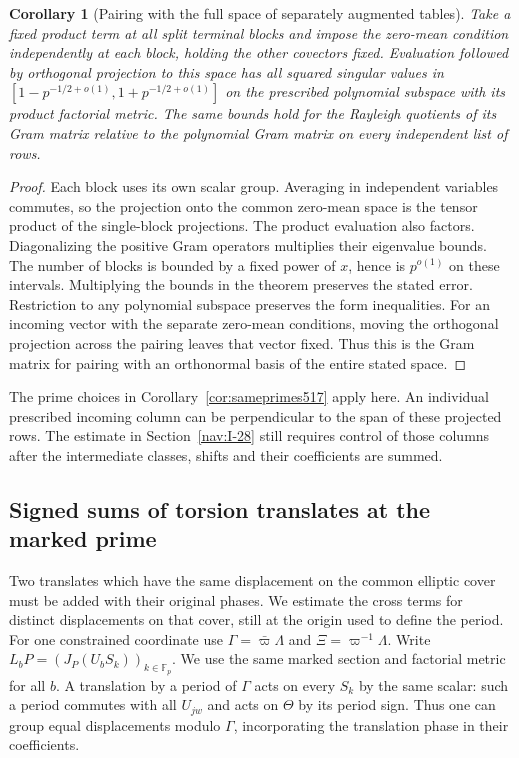 \documentclass[a4paper,11pt]{article}
\newtheorem{corollary}[proposition]{Corollary}
\theoremstyle{definition}
\theoremstyle{remark}
\numberwithin{equation}{section}
\begin{document}
\begin{corollary}[Pairing with the full space of separately augmented tables]
\leavevmode\label{cor:multipleaugmentations519}
Take a fixed product term at all split terminal blocks and impose
the zero-mean condition independently at each block, holding the
other covectors fixed. Evaluation followed by orthogonal projection
to this space has all squared singular values in
\([1-p^{-1/2+o(1)},1+p^{-1/2+o(1)}]\) on the prescribed polynomial
subspace with its product factorial metric. The same bounds hold
for the Rayleigh quotients of its Gram matrix relative to the
polynomial Gram matrix on every independent list of rows.
\end{corollary}
\begin{proof}
Each block uses its own scalar group. Averaging in independent
variables commutes, so the projection onto the common zero-mean
space is the tensor product of the single-block projections. The
product evaluation also factors. Diagonalizing the positive Gram
operators multiplies their eigenvalue bounds. The number of blocks
is bounded by a fixed power of \(x\), hence is \(p^{o(1)}\) on
these intervals. Multiplying the bounds in the theorem preserves
the stated error. Restriction to any polynomial subspace preserves
the form inequalities. For an incoming vector with the separate
zero-mean conditions, moving the orthogonal projection across the
pairing leaves that vector fixed. Thus this is the Gram matrix for
pairing with an orthonormal basis of the entire stated space.
\end{proof}

The prime choices in Corollary~\ref{cor:sameprimes517} apply here.
An individual prescribed incoming column can be perpendicular to
the span of these projected rows. The estimate in
Section~\ref{nav:I-28} still requires control of those columns after
the intermediate classes, shifts and their coefficients are summed.


\subsection{Signed sums of torsion translates at the marked prime}
\label{sec:signedtranslates520}

Two translates which have the same displacement on the common
elliptic cover must be added with their original phases. We estimate
the cross terms for distinct displacements on that cover, still at
the origin used to define the period. For one constrained coordinate
use \(\Gamma=\bar\varpi\Lambda\) and \(\Xi=\varpi^{-1}\Lambda\).
Write \(L_bP=(J_P(U_bS_k))_{k\in\mathbb F_p}\). We use the same
marked section and factorial metric for all \(b\). A translation
by a period of \(\Gamma\) acts on every \(S_k\) by the same scalar:
such a period commutes with all \(U_{jw}\) and acts on \(\Theta\)
by its period sign. Thus one can group equal displacements modulo
\(\Gamma\), incorporating the translation phase in their coefficients.
\end{document}
